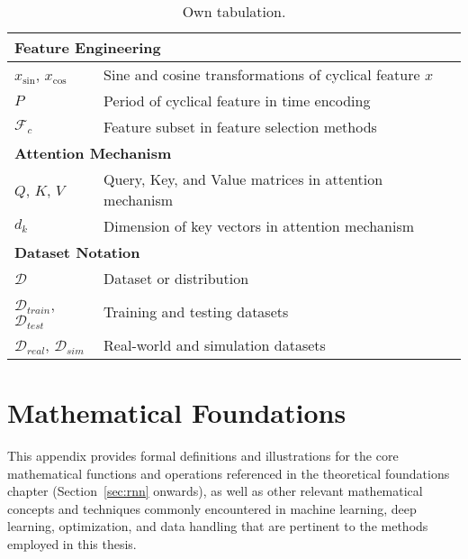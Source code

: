 \begin{appendices}
\begin{table}[htbp]
{\begin{tabular}{p{}p{}}
        \midrule
        \multicolumn{2}{l}{\textbf{Feature Engineering}}                                                                                   \\
        \midrule
        $x_{\sin}$, $x_{\cos}$                      & Sine and cosine transformations of cyclical feature $x$                              \\
        $P$                                         & Period of cyclical feature in time encoding                                          \\
        $\mathcal{F}_c$                             & Feature subset in feature selection methods                                          \\
        \midrule
        \multicolumn{2}{l}{\textbf{Attention Mechanism}}                                                                                   \\
        \midrule
        $Q$, $K$, $V$                               & Query, Key, and Value matrices in attention mechanism                                \\
        $d_k$                                       & Dimension of key vectors in attention mechanism                                      \\
        \midrule
        \multicolumn{2}{l}{\textbf{Dataset Notation}}                                                                                      \\
        \midrule
        $\mathcal{D}$                               & Dataset or distribution                                                              \\
        $\mathcal{D}_{train}$, $\mathcal{D}_{test}$ & Training and testing datasets                                                        \\
        $\mathcal{D}_{real}$, $\mathcal{D}_{sim}$   & Real-world and simulation datasets                                                   \\
        \bottomrule
      \end{tabular}
      \caption*{Own tabulation.}
    }
  \end{table}

  \section{Mathematical Foundations}
  \label{app:math_foundations}

  This appendix provides formal definitions and illustrations for the core mathematical functions and operations referenced in the theoretical foundations chapter (Section~\ref{sec:rnn} onwards), as well as other relevant mathematical concepts and techniques commonly encountered in machine learning, deep learning, optimization, and data handling that are pertinent to the methods employed in this thesis.



\end{appendices}

